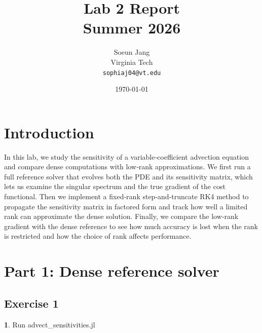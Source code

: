 \documentclass[11pt]{article}
\title{
    \vspace{-1cm}
    \textbf{Lab 2 Report}\\
    \vspace{0.2cm}
    Summer 2026
}
\author{
    Soeun Jang \\
    Virginia Tech \\
    \texttt{sophiaj04@vt.edu}
}
\date{\today}
\begin{document}
\maketitle
\newpage   

\tableofcontents
\newpage   

\section*{Introduction}

In this lab, we study the sensitivity of a variable‑coefficient advection equation and compare dense computations with low‑rank approximations. We first run a full reference solver that evolves both the PDE and its sensitivity matrix, which lets us examine the singular spectrum and the true gradient of the cost functional. Then we implement a fixed‑rank step‑and‑truncate RK4 method to propagate the sensitivity matrix in factored form and track how well a limited rank can approximate the dense solution. Finally, we compare the low‑rank gradient with the dense reference to see how much accuracy is lost when the rank is restricted and how the choice of rank affects performance.


\section*{Part 1: Dense reference solver}

\subsection*{Exercise 1}
\textbf{1}. Run advect\_sensitivities.jl
\end{document}
